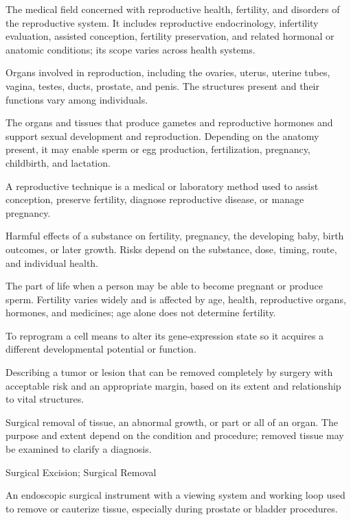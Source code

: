  The medical field concerned with reproductive health, fertility, and disorders
of the reproductive system. It includes reproductive endocrinology, infertility evaluation,
assisted conception, fertility preservation, and related hormonal or anatomic conditions;
its scope varies across health systems.

 Organs involved in reproduction, including the ovaries, uterus, uterine tubes, vagina, testes, ducts, prostate, and penis. The structures present and their functions vary among individuals.

 The organs and tissues that produce gametes and reproductive hormones and support sexual development and reproduction. Depending on the anatomy present, it may enable sperm or egg production, fertilization, pregnancy, childbirth, and lactation.

 A reproductive technique is a medical or laboratory method used to assist conception, preserve fertility, diagnose reproductive disease, or manage pregnancy.

 Harmful effects of a substance on fertility, pregnancy, the developing baby, birth outcomes, or later growth. Risks depend on the substance, dose, timing, route, and individual health.

 The part of life when a person may be able to become pregnant or produce sperm. Fertility varies widely and is affected by age, health, reproductive organs, hormones, and medicines; age alone does not determine fertility.

 To reprogram a cell means to alter its gene-expression state so it acquires a different developmental potential or function.

 Describing a tumor or lesion that can be removed completely by surgery with acceptable risk and an appropriate margin, based on its extent and relationship to vital structures.

 Surgical removal of tissue, an abnormal growth, or part or all of an organ. The purpose and extent depend on the condition and procedure; removed tissue may be examined to clarify a diagnosis.

\synonyms
Surgical Excision; Surgical Removal

 An endoscopic surgical instrument with a viewing system and working loop used to remove or cauterize tissue, especially during prostate or bladder procedures.

